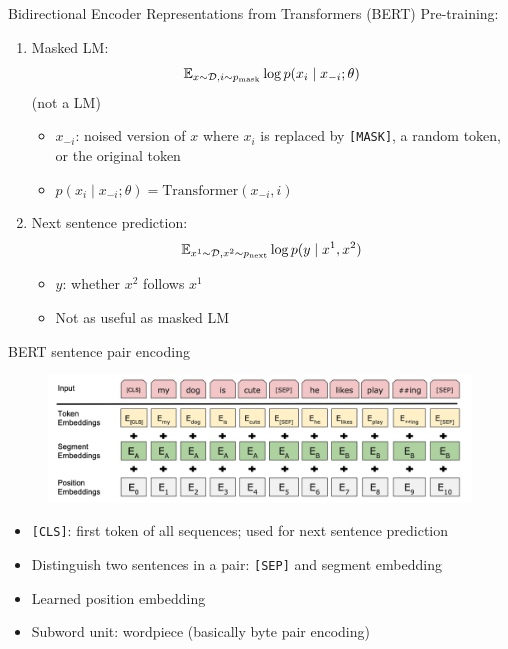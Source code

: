\documentclass[usenames,dvipsnames,notes]{beamer}
\begin{document}
\begin{frame}
    {Bidirectional Encoder Representations from Transformers (BERT)}
    Pre-training:\\
    \begin{enumerate}
        \item Masked LM: $$\mathbb{E}_{x\sim\mathcal{D}, i\sim p_{\text{mask}}} \log p(x_i\mid x_{-i}; \theta)$$ (not a LM)
            \begin{itemize}
                \item $x_{-i}$: noised version of $x$ where $x_i$ is replaced by \texttt{[MASK]}, a random token, or the original token
                \item $p(x_i\mid x_{-i}; \theta) = \text{Transformer}(x_{-i}, i)$
            \end{itemize}
        \item Next sentence prediction:
            $$
            \mathbb{E}_{x^1 \sim\mathcal{D}, x^2\sim p_{\text{next}}} \log p(y\mid x^1, x^2)
            $$
            \begin{itemize}
                \item $y$: whether $x^2$ follows $x^1$
                \item Not as useful as masked LM
            \end{itemize}
    \end{enumerate}
\end{frame}

\begin{frame}
    {BERT sentence pair encoding}
    \begin{figure}
            \includegraphics[width=.9\textwidth]{figures/bert}
    \end{figure}
    \begin{itemize}
        \item \texttt{[CLS]}: first token of all sequences; used for next sentence prediction
        \item Distinguish two sentences in a pair: \texttt{[SEP]} and segment embedding
        \item Learned position embedding
        \item Subword unit: wordpiece (basically byte pair encoding) 
    \end{itemize}
\end{frame}
\end{document}
